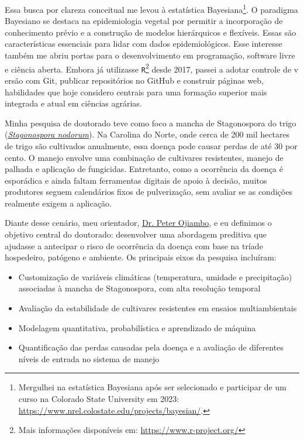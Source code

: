 \documentclass[12pt,a4paper,oneside]{book}
\begin{document}
Essa busca por clareza conceitual me levou à estatística 
Bayesiana\footnote{Mergulhei na estatística Bayesiana após ser selecionado e participar 
  de um curso na Colorado State University em 2023: \url{https://www.nrel.colostate.edu/projects/bayesian/}.}. O 
paradigma Bayesiano se destaca na epidemiologia vegetal por permitir a incorporação de conhecimento 
prévio e a construção de modelos hierárquicos e flexíveis. Essas são características essenciais para lidar com dados 
epidemiológicos. Esse interesse também me abriu portas para o desenvolvimento em programação, 
software livre e ciência aberta. Embora já utilizasse \texttt{R}\footnote{Mais informações 
  disponíveis em: \url{https://www.r-project.org/}} desde 2017, passei a adotar controle de v
ersão com Git, publicar repositórios no GitHub e construir páginas web, habilidades que hoje considero 
centrais para uma formação superior mais integrada e atual em ciências agrárias.

Minha pesquisa de doutorado teve como foco a mancha de Stagonospora do trigo
(\href{https://en.wikipedia.org/wiki/Phaeosphaeria_nodorum}{\textit{Stagonospora nodorum}}). Na Carolina 
do Norte, onde cerca de 200 mil hectares de trigo são cultivados anualmente, essa doença pode causar 
perdas de até 30 por cento. O manejo envolve uma combinação de cultivares resistentes, manejo de 
palhada e aplicação de fungicidas. Entretanto, como a ocorrência da doença é esporádica e ainda 
faltam ferramentas digitais de apoio à decisão, muitos produtores seguem calendários fixos de 
pulverização, sem avaliar se as condições realmente exigem a aplicação.

Diante desse cenário, meu orientador, \href{https://cals.ncsu.edu/entomology-and-plant-pathology/people/pojiamb/}{Dr. Peter Ojiambo}, e 
eu definimos o objetivo central do doutorado: desenvolver uma abordagem preditiva que ajudasse a antecipar 
o risco de ocorrência da doença com base na tríade hospedeiro, patógeno e ambiente. Os principais eixos da 
pesquisa incluíram:
  
\begin{itemize}
  \item Customização de variáveis climáticas (temperatura, umidade e precipitação) associadas à mancha de Stagonospora, com alta resolução temporal
  \item Avaliação da estabilidade de cultivares resistentes em ensaios multiambientais
  \item Modelagem quantitativa, probabilística e aprendizado de máquina
  \item Quantificação das perdas causadas pela doença e a avaliação de diferentes níveis de entrada no sistema de manejo
\end{itemize}
\end{document}

